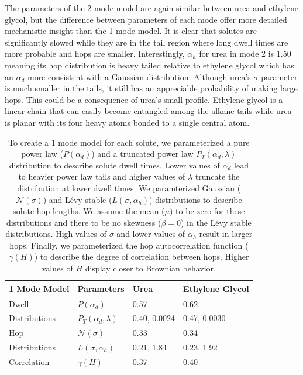 \documentclass{article}
\begin{document}
  The parameters of the 2 mode model are again similar between urea and ethylene glycol, 
  but the difference between parameters of each mode offer more detailed mechanistic
  insight than the 1 mode model. It is clear that solutes are significantly slowed while
  they are in the tail region where long dwell times are more probable and hops are 
  smaller. Interestingly, $\alpha_h$ for urea in mode 2 is 1.50 meaning its hop distribution is
  heavy tailed relative to ethylene glycol which has an $\alpha_d$ more consistent 
  with a Gaussian distribution. Although urea's $\sigma$ parameter is much smaller in 
  the tails, it still has an appreciable probability of making large hops. This could 
  be a consequence of urea's small profile. Ethylene glycol is a linear chain that can
  easily become entangled among the alkane tails while urea is planar with its four
  heavy atoms bonded to a single central atom.
  
  \begin{table}[h]
  \centering
  \begin{tabular}{|M{2cm}|M{1.65cm}|M{1.95cm}|M{1.95cm}|}
   Mode Model  & Parameters                & Urea         & Ethylene Glycol \\
  \hline
  Dwell         & $P(\alpha_d)$             & 0.57         & 0.62            \\
  Distributions & $P_T(\alpha_d, \lambda)$  & 0.40, 0.0024 & 0.47, 0.0030    \\\hline
  Hop           & $\mathcal{N}(\sigma)$     & 0.33         & 0.34            \\
  Distributions & $L(\sigma, \alpha_h)$     & 0.21, 1.84   & 0.23, 1.92      \\\hline
  Correlation   & $\gamma(H)$               & 0.37         & 0.40            \\
  \hline 
  \end{tabular}
  \caption{To create a 1 mode model for each solute, we parameterized a pure power
  law ($P(\alpha_d)$) and a truncated power law $P_T(\alpha_d, \lambda)$ distribution 
  to describe solute dwell times. Lower values of $\alpha_d$ lead to heavier power 
  law tails and higher values of $\lambda$ truncate the distribution at lower
  dwell times. We paramterized Gaussian ($\mathcal{N}(\sigma)$) and L\'evy stable 
  ($L(\sigma, \alpha_h)$) distributions to describe solute hop lengths. We assume
  the mean ($\mu$) to be zero for these distributions and there to be no skewness ($\beta=0$)
  in the L\'evy stable distributions. High values of $\sigma$ and lower values of
  $\alpha_h$ result in larger hops. Finally, we parameterized the hop autocorrelation
  function ($\gamma(H)$) to describe the degree of correlation between hops. 
  Higher values of $H$ display closer to Brownian behavior.}\label{table:sfbm_params}
  \end{table}
  
\end{document}

